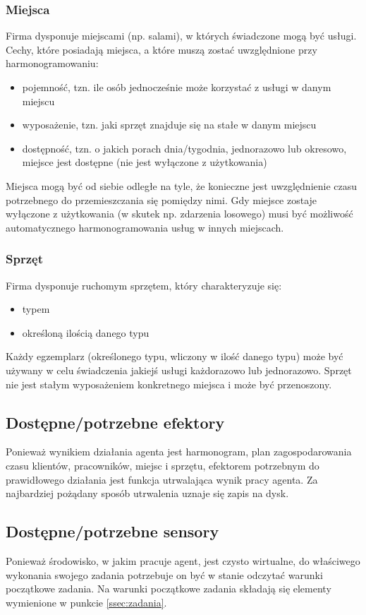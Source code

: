 \subsubsection{Miejsca}\label{sssec:miejsca}
Firma dysponuje miejscami (np. salami), w których świadczone mogą być usługi. Cechy, które posiadają miejsca, a które muszą zostać uwzględnione przy harmonogramowaniu:
\begin{itemize}
	\item{pojemność, tzn. ile osób jednocześnie może korzystać z usługi w danym miejscu}
	\item{wyposażenie, tzn. jaki sprzęt znajduje się na stałe w danym miejscu}
	\item{dostępność, tzn. o jakich porach dnia/tygodnia, jednorazowo lub okresowo, miejsce jest dostępne (nie jest wyłączone z użytkowania)}
\end{itemize}
Miejsca mogą być od siebie odległe na tyle, że konieczne jest uwzględnienie czasu potrzebnego do przemieszczania się pomiędzy nimi.
Gdy miejsce zostaje wyłączone z użytkowania (w skutek np. zdarzenia losowego) musi być możliwość automatycznego harmonogramowania usług w innych miejscach.

\subsubsection{Sprzęt}\label{sssec:sprzet}
Firma dysponuje ruchomym sprzętem, który charakteryzuje się:
\begin{itemize}
	\item{typem}
	\item{określoną ilością danego typu}
\end{itemize}
Każdy egzemplarz (określonego typu, wliczony w ilość danego typu) może być używany w celu świadczenia jakiejś usługi każdorazowo lub jednorazowo.
Sprzęt nie jest stałym wyposażeniem konkretnego miejsca i może być przenoszony.

\subsection{Dostępne/potrzebne efektory}
Ponieważ wynikiem działania agenta jest harmonogram, plan zagospodarowania czasu klientów, pracowników, miejsc i sprzętu, efektorem potrzebnym do prawidłowego działania jest funkcja utrwalająca wynik pracy agenta. Za najbardziej pożądany sposób utrwalenia uznaje się zapis na dysk.

\subsection{Dostępne/potrzebne sensory}
Ponieważ środowisko, w jakim pracuje agent, jest czysto wirtualne, do właściwego wykonania swojego zadania potrzebuje on być w stanie odczytać warunki początkowe zadania. Na warunki początkowe zadania składają się elementy wymienione w punkcie \ref{ssec:zadania}.

